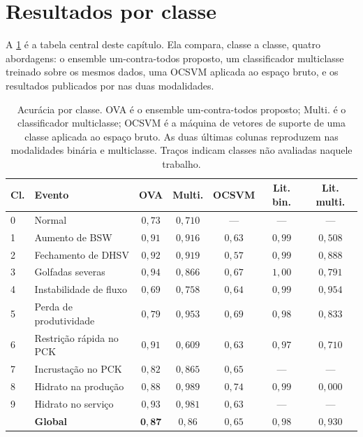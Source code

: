 \section{Resultados por classe}

A \cref{tab:binarios-porclasse} é a tabela central deste capítulo. Ela compara, classe
a classe, quatro abordagens: o ensemble um-contra-todos proposto, um classificador
multiclasse treinado sobre os mesmos dados, uma OCSVM aplicada ao espaço bruto, e os
resultados publicados por \citet{Marins2021} nas duas modalidades.

\begin{table}[htbp]
\centering
\caption{Acurácia por classe. OVA é o ensemble um-contra-todos proposto; Multi. é o
classificador multiclasse; OCSVM é a máquina de vetores de suporte de uma classe
aplicada ao espaço bruto. As duas últimas colunas reproduzem \citet{Marins2021} nas
modalidades binária e multiclasse. Traços indicam classes não avaliadas naquele
trabalho.}
\label{tab:binarios-porclasse}
\small
\begin{tabular}{llccccc}
\toprule
\textbf{Cl.} & \textbf{Evento} & \textbf{OVA} & \textbf{Multi.} & \textbf{OCSVM} &
\textbf{Lit. bin.} & \textbf{Lit. multi.} \\
\midrule
0 & Normal                     & $0{,}73$ & $0{,}710$ & --- & --- & --- \\
1 & Aumento de BSW             & $0{,}91$ & $0{,}916$ & $0{,}63$ & $0{,}99$ & $0{,}508$ \\
2 & Fechamento de DHSV         & $0{,}92$ & $0{,}919$ & $0{,}57$ & $0{,}99$ & $0{,}888$ \\
3 & Golfadas severas           & $0{,}94$ & $0{,}866$ & $0{,}67$ & $1{,}00$ & $0{,}791$ \\
4 & Instabilidade de fluxo     & $0{,}69$ & $0{,}758$ & $0{,}64$ & $0{,}99$ & $0{,}954$ \\
5 & Perda de produtividade     & $0{,}79$ & $0{,}953$ & $0{,}69$ & $0{,}98$ & $0{,}833$ \\
6 & Restrição rápida no PCK    & $0{,}91$ & $0{,}609$ & $0{,}63$ & $0{,}97$ & $0{,}710$ \\
7 & Incrustação no PCK         & $0{,}82$ & $0{,}865$ & $0{,}65$ & --- & --- \\
8 & Hidrato na produção        & $0{,}88$ & $0{,}989$ & $0{,}74$ & $0{,}99$ & $0{,}000$ \\
9 & Hidrato no serviço         & $0{,}93$ & $0{,}981$ & $0{,}63$ & --- & --- \\
\midrule
  & \textbf{Global}            & $\bm{0{,}87}$ & $0{,}86$ & $0{,}65$ & $0{,}98$ & $0{,}930$ \\
\bottomrule
\end{tabular}
\end{table}

